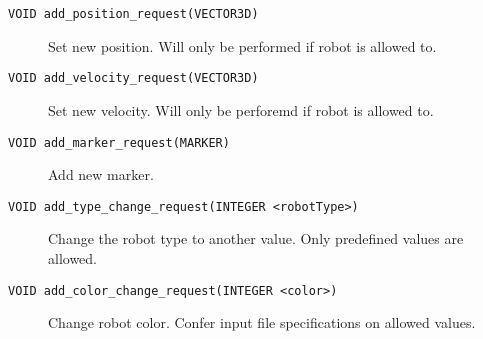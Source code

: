 \begin{description}
	\item [\texttt{VOID add\_position\_request(VECTOR3D)}]
		Set new position. Will only be performed if robot is allowed to.
		
	\item [\texttt{VOID add\_velocity\_request(VECTOR3D)}]
		Set new velocity. Will only be perforemd if robot is allowed to.
		
	\item [\texttt{VOID add\_marker\_request(MARKER)}]
		Add new marker.
		
	\item [\texttt{VOID add\_type\_change\_request(INTEGER <robotType>)}]
		Change the robot type to another value. Only predefined values are allowed.
		
	\item [\texttt{VOID add\_color\_change\_request(INTEGER <color>)}]
		Change robot color. Confer input file specifications on allowed values.
\end{description}


